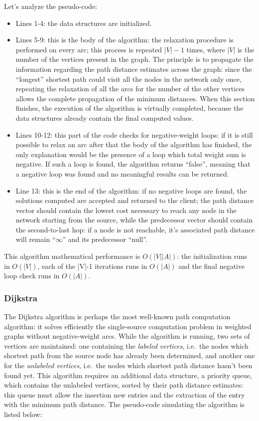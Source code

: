 \documentclass[10pt,a4paper]{report}
\begin{document}
Let's analyze the pseudo-code:
\begin{itemize}
\item Lines 1-4: the data structures are initialized.
\item Lines 5-9: this is the body of the algorithm: the relaxation
  procedure is performed on every arc; this process is repeated
  \(|V|-1\) times, where \(|V|\) is the number of the vertices present
  in the graph. The principle is to propagate the information
  regarding the path distance estimates across the graph: since the
  ``longest'' shortest path could visit all the nodes in the network
  only once, repeating the relaxation of all the arcs for the number
  of the other vertices allows the complete propagation of the minimum
  distances. When this section finishes, the execution of the
  algorithm is virtually completed, because the data structures
  already contain the final computed values.
\item Lines 10-12: this part of the code checks for negative-weight
  loops: if it is still possible to relax an arc after that the body
  of the algorithm has finished, the only explanation would be the
  presence of a loop which total weight sum is negative. If such a
  loop is found, the algorithm returns ``false'', meaning that a
  negative loop was found and no meaningful results can be returned.
\item Line 13: this is the end of the algorithm: if no negative loops
  are found, the solutions computed are accepted and returned to the
  client; the path distance vector should contain the lowest cost
  necessary to reach any node in the network starting from the source,
  while the predecessor vector should contain the second-to-last hop:
  if a node is not reachable, it's associated path distance will
  remain ``\(\infty\)'' and its predecessor ``null''.
\end{itemize}

This algorithm mathematical performance is \(O(|V||A|)\): the
initialization runs in \(O(|V|)\), each of the |V|-1 iterations runs
in \(O(|A|)\) and the final negative loop check runs in \(O(|A|)\).

\subsubsection{Dijkstra}

The Dijkstra algorithm is perhaps the most well-known path computation
algorithm: it solves efficiently the single-source computation problem
in weighted graphs without negative-weight arcs. While the algorithm
is running, two sets of vertices are maintained: one containing the
\textit{labeled vertices}, i.e.\ the nodes which shortest path from
the source node has already been determined, and another one for the
\textit{unlabeled vertices}, i.e.\ the nodes which shortest path
distance hasn't been found yet. This algorithm requires an additional
data structure, a priority queue, which contains the unlabeled
vertices, sorted by their path distance estimates: this queue must
allow the insertion new entries and the extraction of the entry with
the minimum path distance. The pseudo-code simulating the algorithm is
listed below:
\end{document}
